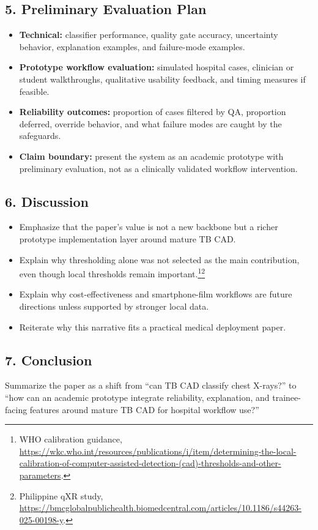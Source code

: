 \documentclass[11pt]{article}
\begin{document}
\subsection{5. Preliminary Evaluation Plan}

\begin{itemize}[leftmargin=1.5em]
    \item \textbf{Technical:} classifier performance, quality gate accuracy, uncertainty behavior, explanation examples, and failure-mode examples.
    \item \textbf{Prototype workflow evaluation:} simulated hospital cases, clinician or student walkthroughs, qualitative usability feedback, and timing measures if feasible.
    \item \textbf{Reliability outcomes:} proportion of cases filtered by QA, proportion deferred, override behavior, and what failure modes are caught by the safeguards.
    \item \textbf{Claim boundary:} present the system as an academic prototype with preliminary evaluation, not as a clinically validated workflow intervention.
\end{itemize}

\subsection{6. Discussion}

\begin{itemize}[leftmargin=1.5em]
    \item Emphasize that the paper's value is not a new backbone but a richer prototype implementation layer around mature TB CAD.
    \item Explain why thresholding alone was not selected as the main contribution, even though local thresholds remain important.\footnote{WHO calibration guidance, \url{https://wkc.who.int/resources/publications/i/item/determining-the-local-calibration-of-computer-assisted-detection-(cad)-thresholds-and-other-parameters}.}\footnote{Philippine qXR study, \url{https://bmcglobalpublichealth.biomedcentral.com/articles/10.1186/s44263-025-00198-y}.}
    \item Explain why cost-effectiveness and smartphone-film workflows are future directions unless supported by stronger local data.
    \item Reiterate why this narrative fits a practical medical deployment paper.
\end{itemize}

\subsection{7. Conclusion}

Summarize the paper as a shift from ``can TB CAD classify chest X-rays?'' to ``how can an academic prototype integrate reliability, explanation, and trainee-facing features around mature TB CAD for hospital workflow use?''
\end{document}
